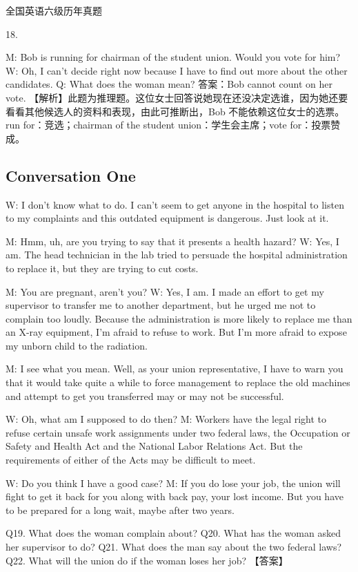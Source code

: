 \documentclass[UTF8,11pt]{ctexart}
\begin{document}
全国英语六级历年真题


18.


M: Bob is running for chairman of the student union. Would you vote for him? W: Oh, I can’t decide right now because I have to find out more about the other candidates. Q: What does the woman mean? 答案：Bob cannot count on her vote. 【解析】此题为推理题。这位女士回答说她现在还没决定选谁，因为她还要看看其他候选人的资料和表现，由此可推断出，Bob 不能依赖这位女士的选票。run for：竞选；chairman of the student union：学生会主席；vote for：投票赞成。


\subsection*{Conversation One}


W: I don’t know what to do. I can’t seem to get anyone in the hospital to listen to my complaints and this outdated equipment is dangerous. Just look at it.


M: Hmm, uh, are you trying to say that it presents a health hazard? W: Yes, I am. The head technician in the lab tried to persuade the hospital administration to replace it, but they are trying to cut costs.


M: You are pregnant, aren’t you? W: Yes, I am. I made an effort to get my supervisor to transfer me to another department, but he urged me not to complain too loudly. Because the administration is more likely to replace me than an X-ray equipment, I’m afraid to refuse to work. But I’m more afraid to expose my unborn child to the radiation.


M: I see what you mean. Well, as your union representative, I have to warn you that it would take quite a while to force management to replace the old machines and attempt to get you transferred may or may not be successful.


W: Oh, what am I supposed to do then? M: Workers have the legal right to refuse certain unsafe work assignments under two federal laws, the Occupation or Safety and Health Act and the National Labor Relations Act. But the requirements of either of the Acts may be difficult to meet.


W: Do you think I have a good case? M: If you do lose your job, the union will fight to get it back for you along with back pay, your lost income. But you have to be prepared for a long wait, maybe after two years.


Q19. What does the woman complain about? Q20. What has the woman asked her supervisor to do? Q21. What does the man say about the two federal laws? Q22. What will the union do if the woman loses her job? 【答案】
\end{document}
